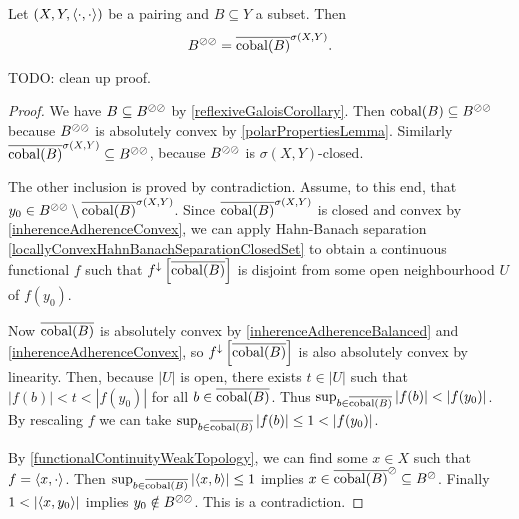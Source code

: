 \begin{proposition} \label{bipolarTheorem}
Let $\sSet{X,Y,\pair{\cdot,\cdot}}$ be a pairing and $B\subseteq Y$ a subset. Then
\[ B^{\oslash\oslash} = \overline{\operatorname{cobal}(B)}^{\sigma(X,Y)}. \]
\end{proposition}
TODO: clean up proof.
\begin{proof}
We have $B\subseteq B^{\oslash\oslash}$ by \ref{reflexiveGaloisCorollary}. Then $\operatorname{cobal}(B) \subseteq B^{\oslash\oslash}$ because $B^{\oslash\oslash}$ is absolutely convex by \ref{polarPropertiesLemma}. Similarly $\overline{\operatorname{cobal}(B)}^{\sigma(X,Y)} \subseteq B^{\oslash\oslash}$, because $B^{\oslash\oslash}$ is $\sigma(X,Y)$-closed.

The other inclusion is proved by contradiction. Assume, to this end, that $y_0\in B^{\oslash\oslash} \setminus \overline{\operatorname{cobal}(B)}^{\sigma(X,Y)}$. Since $\overline{\operatorname{cobal}(B)}^{\sigma(X,Y)}$ is closed and convex by \ref{inherenceAdherenceConvex}, we can apply Hahn-Banach separation \ref{locallyConvexHahnBanachSeparationClosedSet} to obtain a continuous functional $f$ such that $f^\downarrow\left[\overline{\operatorname{cobal}(B)}\right]$ is disjoint from some open neighbourhood $U$ of $f(y_0)$.

Now $\overline{\operatorname{cobal}(B)}$ is absolutely convex by \ref{inherenceAdherenceBalanced} and \ref{inherenceAdherenceConvex}, so $f^\downarrow\left[\overline{\operatorname{cobal}(B)}\right]$ is also absolutely convex by linearity. Then, because $|U|$ is open, there exists $t\in |U|$ such that $|f(b)| < t < |f(y_0)|$ for all $b\in \overline{\operatorname{cobal}(B)}$. Thus $\sup_{b\in \overline{\operatorname{cobal}(B)}}|f(b)| < |f(y_0)|$. By rescaling $f$ we can take $\sup_{b\in \overline{\operatorname{cobal}(B)}}|f(b)| \leq 1 < |f(y_0)|$.

By \ref{functionalContinuityWeakTopology}, we can find some $x\in X$ such that $f = \left\langle x,\cdot \right\rangle$. Then $\sup_{b\in \overline{\operatorname{cobal}(B)}}\left|\left\langle x, b \right\rangle\right| \leq 1$ implies $x\in \overline{\operatorname{cobal}(B)}^\oslash \subseteq B^\oslash$. Finally $1 < \left|\left\langle x, y_0 \right\rangle\right|$ implies $y_0\notin B^{\oslash\oslash}$. This is a contradiction.
\end{proof}

